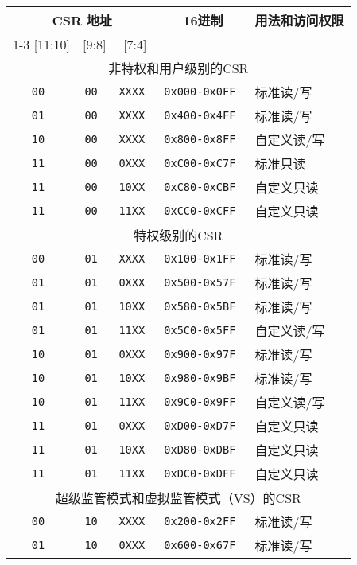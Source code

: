 \begin{table*}[h!]
\begin{center}
\begin{tabular}{|c|c|c|c|l|}
\hline
\multicolumn{3}{|c|}{CSR 地址} & 16进制 & \multicolumn{1}{c|}{用法和访问权限}\\ \cline{1-3}
[11:10] & [9:8] & [7:4]                  &  & \\
\hline
\multicolumn{5}{|c|}{非特权和用户级别的CSR}  \\
\hline
\tt   00   &\tt   00  &\tt   XXXX   & \tt 0x000-0x0FF & 标准读/写 \\
\tt   01   &\tt   00  &\tt   XXXX   & \tt 0x400-0x4FF & 标准读/写 \\
\tt   10   &\tt   00  &\tt   XXXX   & \tt 0x800-0x8FF & 自定义读/写\\
\tt   11   &\tt   00  &\tt   0XXX   & \tt 0xC00-0xC7F & 标准只读 \\
\tt   11   &\tt   00  &\tt   10XX   & \tt 0xC80-0xCBF & 自定义只读 \\
\tt   11   &\tt   00  &\tt   11XX   & \tt 0xCC0-0xCFF & 自定义只读 \\
\hline
\multicolumn{5}{|c|}{特权级别的CSR}  \\
\hline
\tt   00   &\tt   01  &\tt   XXXX   & \tt 0x100-0x1FF & 标准读/写 \\
\tt   01   &\tt   01  &\tt   0XXX   & \tt 0x500-0x57F & 标准读/写 \\
\tt   01   &\tt   01  &\tt   10XX   & \tt 0x580-0x5BF & 标准读/写 \\
\tt   01   &\tt   01  &\tt   11XX   & \tt 0x5C0-0x5FF & 自定义读/写 \\
\tt   10   &\tt   01  &\tt   0XXX   & \tt 0x900-0x97F & 标准读/写 \\
\tt   10   &\tt   01  &\tt   10XX   & \tt 0x980-0x9BF & 标准读/写 \\
\tt   10   &\tt   01  &\tt   11XX   & \tt 0x9C0-0x9FF & 自定义读/写 \\
\tt   11   &\tt   01  &\tt   0XXX   & \tt 0xD00-0xD7F & 自定义只读 \\
\tt   11   &\tt   01  &\tt   10XX   & \tt 0xD80-0xDBF & 自定义只读 \\
\tt   11   &\tt   01  &\tt   11XX   & \tt 0xDC0-0xDFF & 自定义只读 \\
\hline
\multicolumn{5}{|c|}{超级监管模式和虚拟监管模式（VS）的CSR} \\
\hline
\tt   00   &\tt   10  &\tt   XXXX   & \tt 0x200-0x2FF & 标准读/写 \\
\tt   01   &\tt   10  &\tt   0XXX   & \tt 0x600-0x67F & 标准读/写 \\

\end{tabular}
\end{center}
\end{table*}
